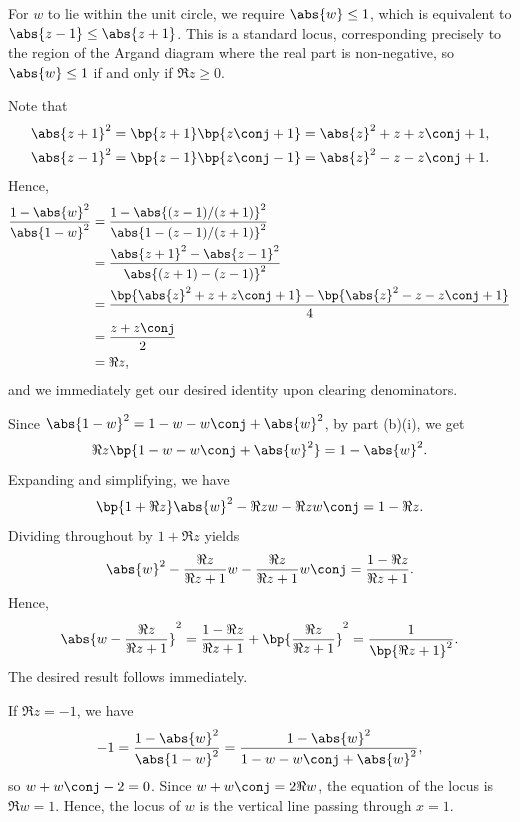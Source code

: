\begin{solution}
    \begin{ppart}
        For $w$ to lie within the unit circle, we require $\abs{w} \leq 1$, which is equivalent to $\abs{z-1} \leq \abs{z+1}$. This is a standard locus, corresponding precisely to the region of the Argand diagram where the real part is non-negative, so $\abs{w} \leq 1$ if and only if $\Re{z} \geq 0$.
    \end{ppart}
    \begin{ppart}
        \begin{psubpart}
            Note that
            \begin{align*}
                \abs{z+1}^2 &= \bp{z+1}\bp{z\conj +1} = \abs{z}^2 + z + z\conj + 1,\\
                \abs{z-1}^2 &= \bp{z-1}\bp{z\conj-1} = \abs{z}^2 - z - z\conj + 1.
            \end{align*}
            Hence,
            \begin{align*}
                \frac{1 - \abs{w}^2}{\abs{1 - w}^2} &= \frac{1 - \abs{(z-1)/(z+1)}^2}{\abs{1 - (z-1)/(z+1)}^2}\\
                &= \frac{\abs{z+1}^2 - \abs{z-1}^2}{\abs{(z+1)-(z-1)}^2} \\
                &= \frac{\bp{\abs{z}^2 + z + z\conj + 1} - \bp{\abs{z}^2 - z - z\conj + 1}}{4}\\
                &= \frac{z + z\conj}{2}\\
                &= \Re z,
            \end{align*}
            and we immediately get our desired identity upon clearing denominators.
        \end{psubpart}
        \begin{psubpart}
            Since $\abs{1 - w}^2 = 1 - w - w\conj + \abs{w}^2$, by part (b)(i), we get \[\Re{z} \bp{1 - w - w\conj + \abs{w}^2} = 1 - \abs{w}^2.\] Expanding and simplifying, we have \[\bp{1 + \Re{z}} \abs{w}^2 - \Re{z} w - \Re{z} w\conj = 1 - \Re{z}.\] Dividing throughout by $1 + \Re{z}$ yields \[\abs{w}^2 - \frac{\Re{z}}{\Re{z} + 1} w- \frac{\Re{z}}{\Re{z} + 1} w\conj = \frac{1 - \Re{z}}{\Re{z} + 1}.\] Hence, \[\abs{w - \frac{\Re{z}}{\Re{z} +1}}^2 = \frac{1 - \Re{z}}{\Re{z} + 1} + \bp{\frac{\Re{z}}{\Re{z} + 1}}^2 = \frac1{\bp{\Re{z} + 1}^2}.\] The desired result follows immediately.
        \end{psubpart}
        \begin{psubpart}
            If $\Re{z} = -1$, we have \[-1 = \frac{1 - \abs{w}^2}{\abs{1 - w}^2} = \frac{1 - \abs{w}^2}{1 - w - w\conj + \abs{w}^2},\] so $w + w\conj -2 = 0$. Since $w + w\conj = 2\Re{w}$, the equation of the locus is $\Re{w} = 1$. Hence, the locus of $w$ is the vertical line passing through $x = 1$.
        \end{psubpart}
    \end{ppart}
\end{solution}

